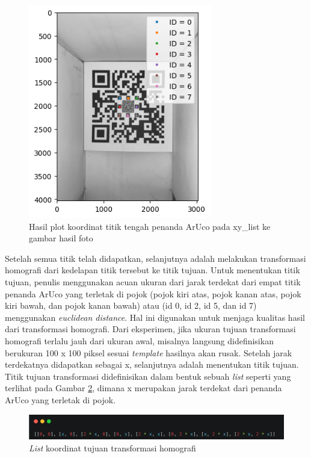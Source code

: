 \begin{figure}[h]
	\centering
	\includegraphics[width=8cm]{contents/chapter-3/3-plotxylist.png}
	\caption{Hasil plot koordinat titik tengah penanda ArUco pada xy\_list ke gambar hasil foto}
	\label{Fig: 3-plotxylist}
\end{figure}

Setelah semua titik telah didapatkan, selanjutnya adalah melakukan transformasi homografi dari kedelapan titik tersebut ke titik tujuan. Untuk menentukan titik
tujuan, penulis menggunakan acuan ukuran dari jarak terdekat dari empat titik penanda ArUco yang terletak di pojok (pojok kiri atas, pojok kanan atas, pojok
kiri bawah, dan pojok kanan bawah) atau (id 0, id 2, id 5, dan id 7) menggunakan \emph{euclidean distance}. Hal ini digunakan untuk menjaga kualitas hasil dari
transformasi homografi. Dari eksperimen, jika ukuran tujuan transformasi homografi terlalu jauh dari ukuran awal, misalnya langsung didefinisikan berukuran 100
x 100 piksel sesuai \emph{template} hasilnya akan rusak. Setelah jarak terdekatnya didapatkan sebagai x, selanjutnya adalah menentukan titik tujuan. Titik
tujuan transformasi didefinisikan dalam bentuk sebuah \emph{list} seperti yang terlihat pada Gambar \ref{Fig: 3-koordinattujuan}, dimana x merupakan jarak
terdekat dari penanda ArUco yang terletak di pojok.

\begin{figure}[h]
	\centering
	\includegraphics[width=13cm]{contents/chapter-3/3-koordinattujuan.png}
	\caption{\emph{List} koordinat tujuan transformasi homografi}
	\label{Fig: 3-koordinattujuan}
\end{figure}


